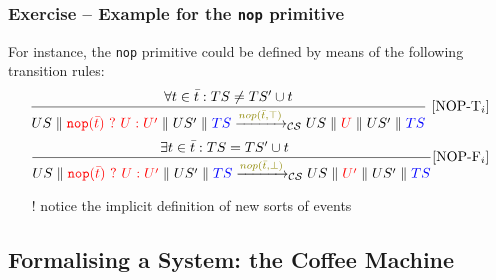 \documentclass[presentation]{beamer}\mode<presentation>{\usetheme{AMSCesenaPurpleAndGold}}
\begin{document}
\begin{frame}
\frametitle{Exercise \currentExercise{} -- Example for the \texttt{nop} primitive}

    For instance, the \texttt{nop} primitive could be defined by means of the following transition rules:
    \medskip
    \[
		\frac{
			\forall t \in \bar{t} : TS \neq TS' \cup t
		}{
			US \parallel \highlightR{\mathtt{nop}(\bar t)\ ?\ U : U'} \parallel US' \parallel \highlightB{TS}
			\xrightarrow{\highlightG{nop(\bar t, \top)}}_\mathcal{CS}
			US \parallel \highlightR{U} \parallel US' \parallel \highlightB{TS}
		} 
		~[\text{NOP-T}_i]
	\]
    \[
		\frac{
			\exists t \in \bar{t} : TS = TS' \cup t \quad 
		}{
			US \parallel \highlightR{\mathtt{nop}(\bar t)\ ?\ U : U'} \parallel US' \parallel \highlightB{TS}
			\xrightarrow{\highlightG{nop(\bar t, \bot)}}_\mathcal{CS}
			US \parallel \highlightR{U'} \parallel US' \parallel \highlightB{TS}
		} 
		[\text{NOP-F}_i]
    \]
    
    \medskip

    \begin{itemize}
        \item[!] notice the implicit definition of new sorts of events
    \end{itemize}

\end{frame}

\startExercise

\subsection{Formalising a System: the Coffee Machine}
\end{document}
